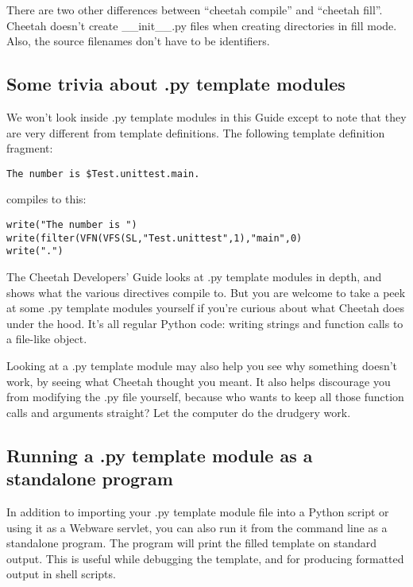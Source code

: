 There are two other differences between ``cheetah compile'' and ``cheetah fill''.
Cheetah doesn't create \_\_init\_\_.py files when creating directories in
fill mode.  Also, the source filenames don't have to be identifiers.


\subsection{Some trivia about .py template modules}
\label{howWorks.pyTrivia}

We won't look inside .py template modules in this Guide except to note that
they are very different from template definitions.  The following template
definition fragment:

\begin{verbatim}
The number is $Test.unittest.main.
\end{verbatim}

compiles to this:

\begin{verbatim}
write("The number is ")  
write(filter(VFN(VFS(SL,"Test.unittest",1),"main",0)
write(".")
\end{verbatim}

The Cheetah Developers' Guide looks at .py template
modules in depth, and shows what the various directives compile to.
But you are welcome to take a peek at some .py template modules yourself
if you're curious about what Cheetah does under the hood.  It's all
regular Python code: writing strings and function calls to a file-like
object.

Looking at a .py template module may also help you see why something
doesn't work, by seeing what Cheetah thought you meant.  It also helps 
discourage you from modifying the .py file yourself, because who wants to
keep all those function calls and arguments straight?  Let the computer
do the drudgery work.


\subsection{Running a .py template module as a standalone program}
\label{howWorks.standalone}

In addition to importing your .py template module file into a Python
script or using it as a Webware servlet, you can also run it from the
command line as a standalone program.  The program will print the filled
template on standard output.  This is useful while debugging the template,
and for producing formatted output in shell scripts.

